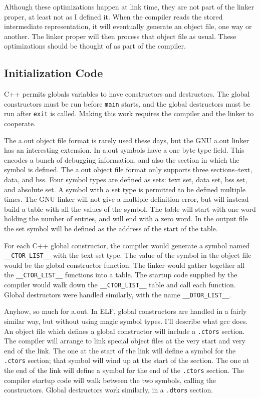 Although these optimizations happen at link time, they are not part of the
linker proper, at least not as I defined it. When the compiler reads the stored
intermediate representation, it will eventually generate an object file, one
way or another. The linker proper will then process that object file as usual.
These optimizations should be thought of as part of the compiler.

\subsection{Initialization Code}

C++ permits globals variables to have constructors and destructors. The
global constructors must be run before \texttt{main} starts, and the global
destructors must be run after \texttt{exit} is called. Making this work
requires the compiler and the linker to cooperate.

The a.out object file format is rarely used these days, but the GNU a.out
linker has an interesting extension. In a.out symbols have a one byte type
field. This encodes a bunch of debugging information, and also the section
in which the symbol is defined. The a.out object file format only supports
three sections–text, data, and bss. Four symbol types are defined as sets:
text set, data set, bss set, and absolute set. A symbol with a set type is
permitted to be defined multiple times. The GNU linker will not give a multiple
definition error, but will instead build a table with all the values of the
symbol. The table will start with one word holding the number of entries, and
will end with a zero word. In the output file the set symbol will be defined as
the address of the start of the table.

For each C++ global constructor, the compiler would generate a symbol named
\texttt{\_\_CTOR\_LIST\_\_} with the text set type. The value of the symbol
in the object file would be the global constructor function. The linker
would gather together all the \texttt{\_\_CTOR\_LIST\_\_} functions into
a table. The startup code supplied by the compiler would walk down the
\texttt{\_\_CTOR\_LIST\_\_} table and call each function. Global destructors
were handled similarly, with the name \texttt{\_\_DTOR\_LIST\_\_}.

Anyhow, so much for a.out. In ELF, global constructors are handled in a
fairly similar way, but without using magic symbol types. I'll describe what
gcc does. An object file which defines a global constructor will include a
\texttt{.ctors} section. The compiler will arrange to link special object files
at the very start and very end of the link. The one at the start of the link
will define a symbol for the \texttt{.ctors} section; that symbol will wind
up at the start of the section. The one at the end of the link will define a
symbol for the end of the \texttt{.ctors} section. The compiler startup code
will walk between the two symbols, calling the constructors. Global destructors
work similarly, in a \texttt{.dtors} section.

